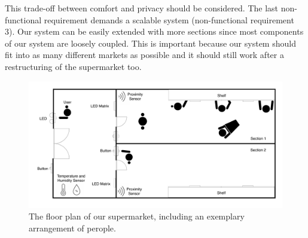 \documentclass[runningheads]{llncs}
\begin{document}
	This trade-off between comfort and privacy should be considered. 
	The last non-functional requirement demands a scalable system (non-functional requirement 3).
	Our system can be easily extended with more sections since most components of our system are loosely coupled. 
	This is important because our system should fit into as many different markets as possible and it should still work after a restructuring of the supermarket too.
	\begin{figure}[bt]
		\centering
		\includegraphics[width=\linewidth]{figures/floorplan.pdf}
		\caption{The floor plan of our supermarket, including an exemplary arrangement of perople.}
		\label{fig:floorplan}
	\end{figure}
\end{document}
